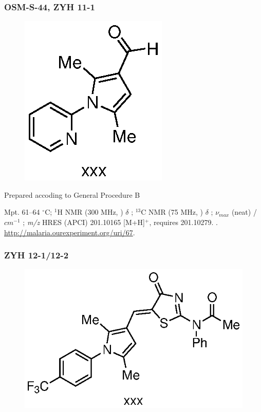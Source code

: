 \documentclass[12pt, a4paper,titlepage]{article}
\begin{document}
{\subsubsection*{OSM-S-44, ZYH 11-1}
\label{exp:ZYH11}
	\begin{figure}[H]
	\begin{center}
	\includegraphics{exp/ZYH11.eps}
	\end{center}
	\vspace{-25pt}	
	\end{figure}

Prepared accoding to General Procedure B

Mpt. 61--64 $^\circ$C; 
$^1$H NMR (300 MHz, ) $\delta$ ; 
  $^{13}$C NMR (75 MHz, ) $\delta$ ; 
 $\nu_{max}$ (neat) /$cm^{-1}$ ; 
\emph{m/z} HRES (APCI) 201.10165 [M+H]$^+$,  requires 201.10279.
. 
\url{http://malaria.ourexperiment.org/uri/67}. 

\subsubsection*{ZYH 12-1/12-2}
\label{exp:ZYH12}
	\begin{figure}[H]
	\begin{center}
	\includegraphics{exp/ZYH12.eps}
	\end{center}
	\vspace{-25pt}	
	\end{figure}

}
\end{document}
